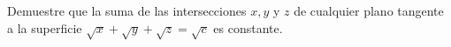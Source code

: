 \item Demuestre que la suma de las intersecciones $x, y$ y $z$ de cualquier plano tangente a la superficie $\sqrt{x} + \sqrt{y} + \sqrt{z} = \sqrt{c}$ es constante.
